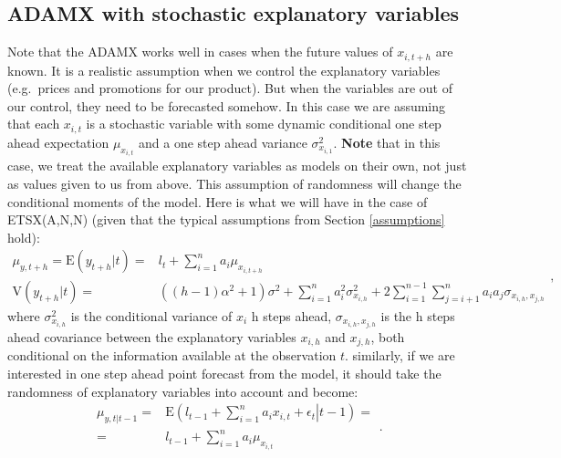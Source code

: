 \documentclass[]{book}
\theoremstyle{definition}
\theoremstyle{definition}
\theoremstyle{definition}
\theoremstyle{definition}
\theoremstyle{remark}
\begin{document}
\hypertarget{ADAMXConventionalConditionalMomentsRandom}{%
\subsection{ADAMX with stochastic explanatory variables}\label{ADAMXConventionalConditionalMomentsRandom}}

Note that the ADAMX works well in cases when the future values of \(x_{i,t+h}\) are known. It is a realistic assumption when we control the explanatory variables (e.g.~prices and promotions for our product). But when the variables are out of our control, they need to be forecasted somehow. In this case we are assuming that each \(x_{i,t}\) is a stochastic variable with some dynamic conditional one step ahead expectation \(\mu_{x_{i,t}}\) and a one step ahead variance \(\sigma^2_{x_{i,1}}\). \textbf{Note} that in this case, we treat the available explanatory variables as models on their own, not just as values given to us from above. This assumption of randomness will change the conditional moments of the model. Here is what we will have in the case of ETSX(A,N,N) (given that the typical assumptions from Section \ref{assumptions} hold):
\begin{equation}
  \begin{aligned}
    \mu_{y,t+h} = \text{E}(y_{t+h}|t) = & l_{t} + \sum_{i=1}^n a_i \mu_{x_{i,t+h}} \\
    \text{V}(y_{t+h}|t) = & \left((h-1) \alpha^2 + 1 \right) \sigma^2 + \sum_{i=1}^n a^2_i \sigma^2_{x_{i,h}} + 2 \sum_{i=1}^{n-1} \sum_{j=i+1}^n a_i a_j \sigma_{x_{i,h},x_{j,h}}
  \end{aligned},
  \label{eq:ETSXADAMStateSpaceANNRecursionMeanAndVarianceRandomness}
\end{equation}
where \(\sigma^2_{x_{i,h}}\) is the conditional variance of \(x_{i}\) h steps ahead, \(\sigma_{x_{i,h},x_{j,h}}\) is the h steps ahead covariance between the explanatory variables \(x_{i,h}\) and \(x_{j,h}\), both conditional on the information available at the observation \(t\). similarly, if we are interested in one step ahead point forecast from the model, it should take the randomness of explanatory variables into account and become:
\begin{equation}
  \begin{aligned}
    \mu_{y,t |t-1} = &  \left. \mathrm{E}\left(l_{t-1} + \sum_{i=1}^n a_i x_{i,t} + \epsilon_{t} \right| t-1 \right) = \\
                = & l_{t-1} + \sum_{i=1}^n a_i \mu_{x_{i,t}}
  \end{aligned}.
  \label{eq:ADAMETSXANNStepAhead}
\end{equation}
\end{document}
